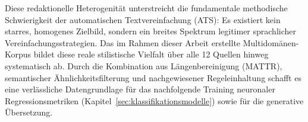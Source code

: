 Diese redaktionelle Heterogenität unterstreicht die fundamentale methodische Schwierigkeit der automatischen Textvereinfachung (ATS): Es existiert kein starres, homogenes Zielbild, sondern ein breites Spektrum legitimer sprachlicher Vereinfachungsstrategien. Das im Rahmen dieser Arbeit erstellte Multidomänen-Korpus bildet diese reale stilistische Vielfalt über alle 12 Quellen hinweg systematisch ab. Durch die Kombination aus Längenbereinigung (MATTR), semantischer Ähnlichkeitsfilterung und nachgewiesener Regeleinhaltung schafft es eine verlässliche Datengrundlage für das nachfolgende Training neuronaler Regressionsmetriken (Kapitel~\ref{sec:klassifikationsmodelle}) sowie für die generative Übersetzung.